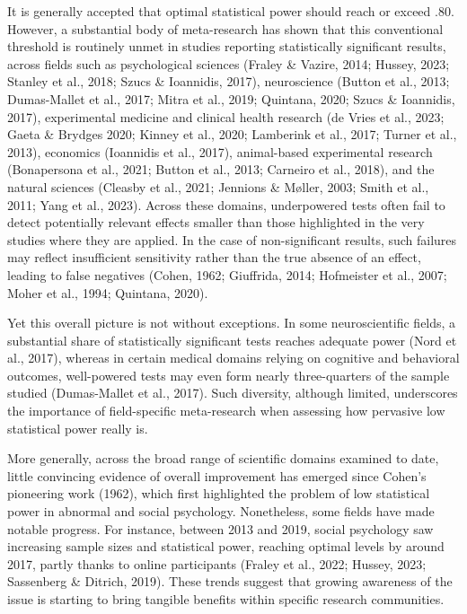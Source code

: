 \documentclass[authordate, meta]{jote-new-article}
\begin{document}
	It is generally accepted that optimal statistical power should reach or exceed .80. However, a substantial body of meta-research has shown that this conventional threshold is routinely unmet in studies reporting statistically significant results, across fields such as psychological sciences (Fraley \& Vazire, 2014; Hussey, 2023; Stanley et al., 2018; Szucs \& Ioannidis, 2017), neuroscience (Button et al., 2013; Dumas-Mallet et al., 2017; Mitra et al., 2019; Quintana, 2020; Szucs \& Ioannidis, 2017), experimental medicine and clinical health research (de Vries et al., 2023; Gaeta \& Brydges 2020; Kinney et al., 2020; Lamberink et al., 2017; Turner et al., 2013), economics (Ioannidis et al., 2017), animal-based experimental research (Bonapersona et al., 2021; Button et al., 2013; Carneiro et al., 2018), and the natural sciences (Cleasby et al., 2021; Jennions \& Møller, 2003; Smith et al., 2011; Yang et al., 2023). Across these domains, underpowered tests often fail to detect potentially relevant effects smaller than those highlighted in the very studies where they are applied. In the case of non-significant results, such failures may reflect insufficient sensitivity rather than the true absence of an effect, leading to false negatives (Cohen, 1962; Giuffrida, 2014; Hofmeister et al., 2007; Moher et al., 1994; Quintana, 2020).



	Yet this overall picture is not without exceptions. In some neuroscientific fields, a substantial share of statistically significant tests reaches adequate power (Nord et al., 2017), whereas in certain medical domains relying on cognitive and behavioral outcomes, well-powered tests may even form nearly three-quarters of the sample studied (Dumas-Mallet et al., 2017). Such diversity, although limited, underscores the importance of field-specific meta-research when assessing how pervasive low statistical power really is.



	More generally, across the broad range of scientific domains examined to date, little convincing evidence of overall improvement has emerged since Cohen's pioneering work (1962), which first highlighted the problem of low statistical power in abnormal and social psychology. Nonetheless, some fields have made notable progress. For instance, between 2013 and 2019, social psychology saw increasing sample sizes and statistical power, reaching optimal levels by around 2017, partly thanks to online participants (Fraley et al., 2022; Hussey, 2023; Sassenberg \& Ditrich, 2019). These trends suggest that growing awareness of the issue is starting to bring tangible benefits within specific research communities.
\end{document}

